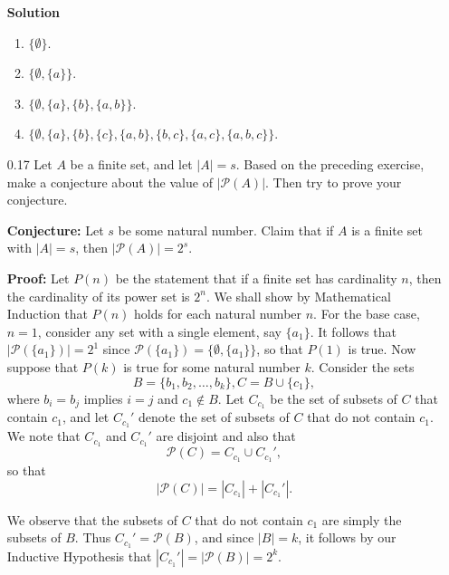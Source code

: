 \begin{enumerate}
      \textbf{Solution}

      \begin{enumerate}
         \item $\{\emptyset\}$.
         \item $\{\emptyset, \{a\}\}$.
         \item $\{\emptyset, \{a\}, \{b\}, \{a, b\}\}$.
         \item $\{\emptyset, \{a\}, \{b\}, \{c\},
                \{a, b\}, \{b, c\}, \{a, c\}, \{a, b, c\}\}$.
      \end{enumerate}
   \item[0.17] Let $A$ be a finite set, and let $|A| = s$. Based on the
               preceding exercise, make a conjecture about the value of
               $|\mathscr{P}(A)|$. Then try to prove your conjecture.
               
      \textbf{Conjecture:} Let $s$ be some natural number. Claim that if $A$ is
      a finite set with $|A| = s$, then $|\mathscr{P}(A)| = 2^s$.
      
      \textbf{Proof:} Let $P(n)$ be the statement that if a finite set has 
      cardinality $n$, then the cardinality of its power set is $2^n$. We shall
      show by Mathematical Induction that $P(n)$ holds for each natural number
      $n$. For the base case, $n = 1$, consider any set with a single element,
      say $\{a_1\}$. It follows that $|\mathscr{P}(\{a_1\})| = 2^1$ since
      $\mathscr{P}(\{a_1\}) = \{\emptyset, \{a_1\}\}$, so that $P(1)$ is true.
      Now suppose that $P(k)$ is true for some natural number $k$. Consider the
      sets
      $$B = \{b_1, b_2, \ldots, b_k\}, C = B \cup \{c_1\},$$
      where $b_i = b_j$ implies $i = j$ and $c_1 \notin B$. Let $C_{c_1}$ be the
      set of subsets of $C$ that contain $c_1$, and let $C_{c_1}'$ denote the
      set of subsets of $C$ that do not contain $c_1$. We note that $C_{c_1}$
      and $C_{c_1}'$ are disjoint and also that
      $$\mathscr{P}(C) = C_{c_1} \cup C_{c_1}',$$
      so that
      $$|\mathscr{P}(C)| = |C_{c_1}| + |C_{c_1}'|.$$
      
      We observe that the subsets of $C$ that do not contain $c_1$ are simply
      the subsets of $B$. Thus $C_{c_1}' = \mathscr{P}(B)$, and since $|B| = k$,
      it follows by our Inductive Hypothesis that
      $|C_{c_1}'| = |\mathscr{P}(B)| = 2^k$.
      

\end{enumerate}
